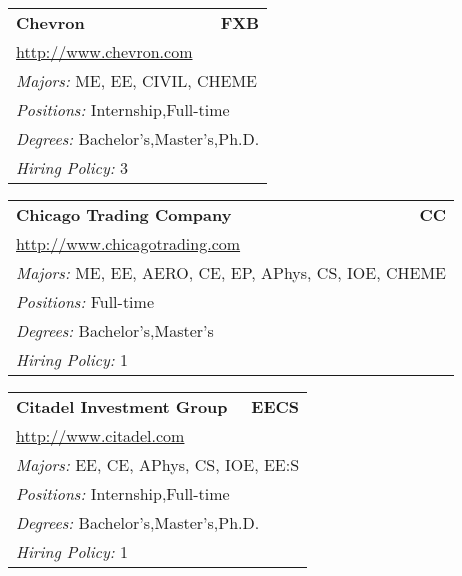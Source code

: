 \documentclass[twoside]{article}
\begin{document}
\begin{center}
\begin{multicols}{3}
\begin{FlushLeft}
\begin{minipage}{\columnwidth}
\end{minipage}
 
\begin{minipage}{\columnwidth}\begin{tabularx}{.95\columnwidth}{Xr}
                 {\Large\bf Chevron} & {\Large\bf FXB}\\
    \multicolumn{2}{p{.95\columnwidth}}{\url{http://www.chevron.com}}\\
    \multicolumn{2}{p{.95\columnwidth}}{\emph{Majors:} ME, EE, CIVIL, CHEME}\\
    \multicolumn{2}{p{.95\columnwidth}}{\emph{Positions:} Internship,Full-time}\\
    \multicolumn{2}{p{.95\columnwidth}}{\emph{Degrees:} Bachelor's,Master's,Ph.D.}\\
    \multicolumn{2}{p{.95\columnwidth}}{\emph{Hiring Policy:} 3}\\
    \end{tabularx}
    
\end{minipage}
 
\begin{minipage}{\columnwidth}\begin{tabularx}{.95\columnwidth}{Xr}
                 {\Large\bf Chicago Trading Company} & {\Large\bf CC}\\
    \multicolumn{2}{p{.95\columnwidth}}{\url{http://www.chicagotrading.com}}\\
    \multicolumn{2}{p{.95\columnwidth}}{\emph{Majors:} ME, EE, AERO, CE, EP, APhys, CS, IOE, CHEME}\\
    \multicolumn{2}{p{.95\columnwidth}}{\emph{Positions:} Full-time}\\
    \multicolumn{2}{p{.95\columnwidth}}{\emph{Degrees:} Bachelor's,Master's}\\
    \multicolumn{2}{p{.95\columnwidth}}{\emph{Hiring Policy:} 1}\\
    \end{tabularx}
    
\end{minipage}
 
\begin{minipage}{\columnwidth}\begin{tabularx}{.95\columnwidth}{Xr}
                 {\Large\bf Citadel Investment Group} & {\Large\bf EECS}\\
    \multicolumn{2}{p{.95\columnwidth}}{\url{http://www.citadel.com}}\\
    \multicolumn{2}{p{.95\columnwidth}}{\emph{Majors:} EE, CE, APhys, CS, IOE, EE:S}\\
    \multicolumn{2}{p{.95\columnwidth}}{\emph{Positions:} Internship,Full-time}\\
    \multicolumn{2}{p{.95\columnwidth}}{\emph{Degrees:} Bachelor's,Master's,Ph.D.}\\
    \multicolumn{2}{p{.95\columnwidth}}{\emph{Hiring Policy:} 1}\\
    \end{tabularx}
    

\end{minipage}
\end{FlushLeft}
\end{multicols}
\end{center}
\end{document}
